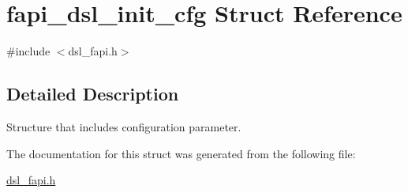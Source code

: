 \hypertarget{structfapi__dsl__init__cfg}{\section{fapi\-\_\-dsl\-\_\-init\-\_\-cfg Struct Reference}
\label{structfapi__dsl__init__cfg}
}


{\ttfamily \#include $<$dsl\-\_\-fapi.\-h$>$}



\subsection{Detailed Description}
Structure that includes configuration parameter. 

The documentation for this struct was generated from the following file\-:\begin{DoxyCompactItemize}
\item 
\hyperlink{dsl__fapi_8h}{dsl\-\_\-fapi.\-h}\end{DoxyCompactItemize}
